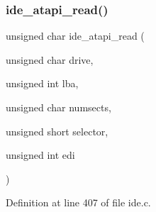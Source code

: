 \mbox{\label{a00023_a1652da42785708fa6ea21ce4aef8c628_a1652da42785708fa6ea21ce4aef8c628}} 
\subsubsection{\texorpdfstring{ide\+\_\+atapi\+\_\+read()}{ide\_atapi\_read()}}
{\footnotesize\ttfamily unsigned char ide\+\_\+atapi\+\_\+read (\begin{DoxyParamCaption}\item[{unsigned char}]{drive,  }\item[{unsigned int}]{lba,  }\item[{unsigned char}]{numsects,  }\item[{unsigned short}]{selector,  }\item[{unsigned int}]{edi }\end{DoxyParamCaption})}



Definition at line 407 of file ide.\+c.



